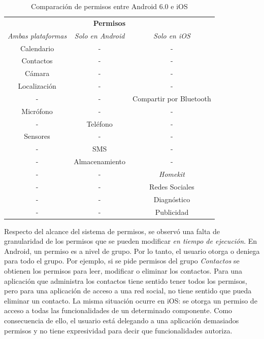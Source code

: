 \begin{table}[tbp]
	\center
	\begin{tabular}{c c c}
		\hline
		\multicolumn{3}{c}{\textbf{Permisos}} \\
		\emph{Ambas plataformas} 	& \emph{Solo en Android}	& \emph{Solo en iOS} \\ \hline    \hline
		Calendario	& -		& -	\\						
		Contactos	& -				& - \\						
		Cámara		& -				& -	\\						
		Localización& -				& -	\\						
		-			& -				& Compartir por Bluetooth\\ 
		Micrófono   & -				& - \\						
		-			& Teléfono		& -	\\						
		Sensores    & -    			& - \\						
		-			& SMS			& - \\						
		-			& Almacenamiento& - \\						
		-			& -				& \emph{Homekit} \\			
		-			& -				& Redes Sociales \\        	
		-			& -				& Diagnóstico \\        			
		-			& -				& Publicidad \\    			\hline
	\end{tabular}
	\caption{Comparación de permisos entre Android 6.0 e iOS}
	\label{tab:chapter03:compPerm}
\end{table}
Respecto del alcance del sistema de permisos, se observó una falta de granularidad de los permisos que se pueden modificar \emph{en tiempo de ejecución}. En Android, un permiso es a nivel de grupo. Por lo tanto, el usuario otorga o deniega para todo el grupo. Por ejemplo, si se pide permisos del grupo \emph{Contactos} se obtienen los permisos para leer, modificar o eliminar los contactos. Para  una aplicación que administra los contactos tiene sentido tener todos los permisos, pero para una aplicación de acceso a una red social, no tiene sentido que pueda eliminar un contacto. La misma situación ocurre en iOS: se otorga un permiso de acceso a todas las funcionalidades de un determinado componente. Como consecuencia de ello, el usuario está delegando a una aplicación demasiados permisos y no tiene expresividad para decir que funcionalidades autoriza.\\

